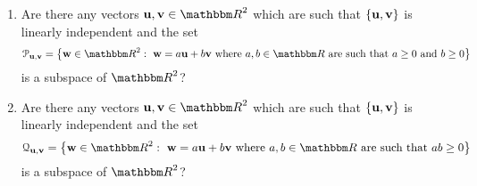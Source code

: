 \begin{enumerate}
\item Are there any vectors $\Bu,\Bv\in\R^2$ which are such that $\{{\bf u},{\bf v}\}$ is linearly independent and the set
\[
\mathcal{P}_{\Bu,\Bv}=\left\{\Bw\in\R^2:\mbox{ }\Bw=a\Bu+b\Bv\mbox{ where }a,b\in\R\mbox{ are such that }a\ge0\mbox{ and }b\ge0\right\}
\]
is a subspace of $\R^2$?
\\
\item Are there any vectors $\Bu,\Bv\in\R^2$ which are such that $\{{\bf u},{\bf v}\}$ is linearly independent and the set
\[
\mathcal{Q}_{\Bu,\Bv}=\left\{\Bw\in\R^2:\mbox{ }\Bw=a\Bu+b\Bv\mbox{ where }a,b\in\R\mbox{ are such that }ab\ge0\right\}
\]
is a subspace of $\R^2$?
\end{enumerate}

